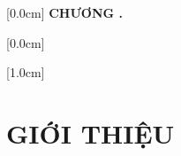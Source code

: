 \documentclass[a4paper,oneside]{report}
\title{\bf \TITLE}
\author{\AUTHOR}
\theoremstyle{definition}
\begin{document}

\newpage
{}
\renewcommand*\contentsname{MỤC LỤC}

    [0.0cm]             %
    {\bfseries\vspace{0.3cm}}                  %
    {{\bfseries{\scshape}
    CHƯƠNG \thecontentslabel.\ }}
    {}         %
    {\contentspage}         %

    [0.0cm]             %
    {\vspace{0.3cm}}                  %
    {\thecontentslabel \ } %
    {}         %
    {\contentspage}         %

    [1.0cm]             %
    {\vspace{0.3cm}}                  %
    {\thecontentslabel \ } %
    {}         %
    {\contentspage}         %

\tableofcontents
\thispagestyle{empty}
\clearpage

\renewcommand{\listfigurename}{DANH MỤC HÌNH VẼ}
{\let\oldnumberline\numberline
\renewcommand{\numberline}{Hình~\oldnumberline}
\listoffigures}

\renewcommand{\listtablename}{DANH MỤC BẢNG BIỂU}
{\let\oldnumberline\numberline
\renewcommand{\numberline}{Bảng~\oldnumberline}
\listoftables}

\glsaddall
\renewcommand*{\glossaryname}{Danh sách thuật ngữ}
\renewcommand*{\acronymname}{DANH MỤC THUẬT NGỮ VÀ TỪ VIẾT TẮT}
\renewcommand*{\entryname}{Thuật ngữ}
\renewcommand*{\descriptionname}{Ý nghĩa}
\printnoidxglossary[type=\acronymtype]


\newpage
{}

\pagestyle{fancy}
\fancyhf{}
\fancyhead[L]{\small\leftmark}
\fancyfoot[L]{\thepage}

\chapter{GIỚI THIỆU}
\label{ch:intro}

\end{document}
